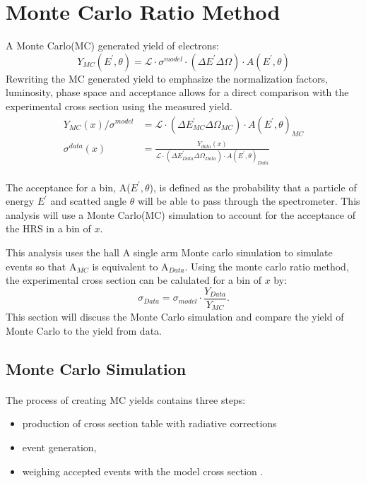  \section{Monte Carlo Ratio Method}
 A Monte Carlo(MC) generated yield of electrons:
\begin{equation}
Y_{MC}(E^{\prime},\theta) = \mathscr{L} \cdot \sigma^{model} \cdot (\Delta E^{\prime} \Delta \Omega) \cdot A(E^{\prime},\theta)
\end{equation}
Rewriting the MC generated yield to emphasize the normalization factors, luminosity, phase space and acceptance allows for a direct comparison with the experimental cross section using the measured yield.
\begin{align}
Y_{MC}(x) / \sigma^{model} &= \mathscr{L} \cdot (\Delta E^{\prime}_{MC} \Delta \Omega_{MC}) \cdot A(E^{\prime},\theta)_{MC} \\
\sigma^{data}(x) &= \frac{Y_{data}(x)}{ \mathscr{L} \cdot (\Delta E^{\prime}_{Data} \Delta \Omega_{Data}) \cdot A(E^{\prime},\theta)_{Data} }
\end{align}

\paragraph{} The acceptance for a bin, A($E^{\prime},\theta$), is defined as the probability that a particle of energy $E^{\prime}$ and scatted angle $\theta$ will be able to pass through the spectrometer. This analysis will use a Monte Carlo(MC) simulation to account for the acceptance of the HRS in a bin of $x$.

This analysis uses the hall A single arm Monte carlo simulation to simulate events so that A$_{MC}$ is equivalent to A$_{Data}$. Using the monte carlo ratio method, the experimental cross section can be calulated for a bin of $x$ by:
\begin{equation}
\sigma_{Data} = \sigma_{model} \cdot \frac{Y_{Data}}{Y_{MC}}.
\end{equation} 
This section will discuss the Monte Carlo simulation and compare the yield of Monte Carlo to the yield from data.

\subsection{Monte Carlo Simulation}

\paragraph{}The process of creating MC yields contains three steps: 
\begin{itemize}
	\item production of cross section table with radiative corrections
	\item event generation,
	\item weighing accepted events with the model cross section .
\end{itemize} 
